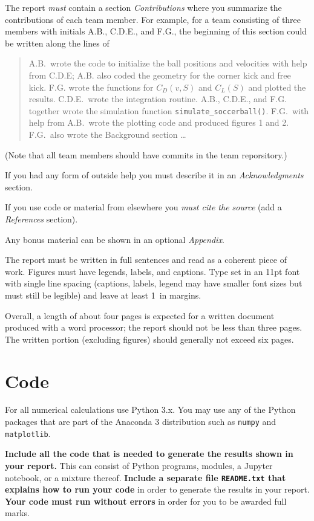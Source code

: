 \documentclass[letterpaper]{scrartcl}
\begin{document}
The report \emph{must} contain a section \emph{Contributions} where
you summarize the contributions of each team member. For example, for
a team consisting of three members with initials A.B., C.D.E., and
F.G., the beginning of this section could be written along the lines
of
\begin{quotation}
  A.B.\ wrote the code to initialize the ball positions and velocities
  with help from C.D.E; A.B. also coded the geometry for the corner
  kick and free kick. F.G. wrote the functions for $C_{D}(v, S)$ and
  $C_{L}(S)$ and plotted the results. C.D.E.\ wrote the integration
  routine. A.B., C.D.E., and F.G. together wrote the simulation
  function \texttt{simulate\_soccerball()}. F.G.\ with help from A.B.\
  wrote the plotting code and produced figures 1 and 2. F.G.\
  also wrote the Background section \dots
\end{quotation}
(Note that all team members should have commits in the team
reporsitory.)

If you had any form of outside help you must describe it in an
\emph{Acknowledgments} section. 

If you use code or material from elsewhere you \emph{must cite the
  source} (add a \emph{References} section). 

Any bonus material can be shown in an optional \emph{Appendix}.

The report must be written in full sentences and read as a coherent
piece of work. Figures must have legends, labels, and captions. Type
set in an 11pt font with single line spacing (captions, labels, legend
may have smaller font sizes but must still be legible) and leave at
least 1~in margins. 

Overall, a length of about four pages is expected for a written
document produced with a word processor; the report should
not be less than three pages. The written portion (excluding figures)
should generally not exceed six pages.

\section{Code}
\label{sec:code}

For all numerical calculations use Python 3.x. You may use any of the
Python packages that are part of the Anaconda 3 distribution such as
\texttt{numpy} and \texttt{matplotlib}. 

\textbf{Include all the code that is needed to generate the results
  shown in your report.} This can consist of Python programs, modules,
a Jupyter notebook, or a mixture thereof. \textbf{Include a separate
  file \texttt{README.txt} that explains how to run your code} in
order to generate the results in your report. \textbf{Your code must
  run without errors} in order for you to be awarded full marks.
\end{document}
